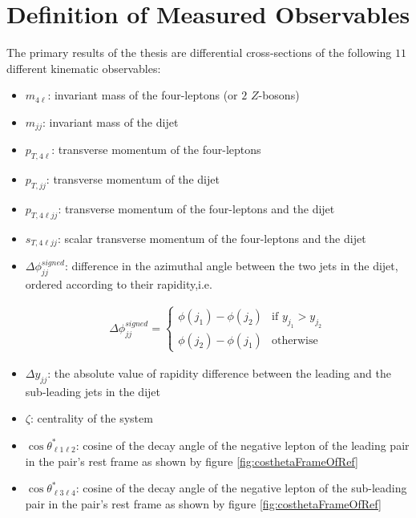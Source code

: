 \section{Definition of Measured Observables}
\label{sec:Obs}

The primary results of the thesis are differential cross-sections of the following $11$ different kinematic observables:

\begin{itemize}

\item{	$m_{4\ell}$: invariant mass of the four-leptons (or $2$ $Z$-bosons)}
\item{ 	$m_{jj}$:  invariant mass of the dijet}
\item{	$p_{T,4\ell}$: transverse momentum of the four-leptons }
\item{	$p_{T, jj}$: transverse momentum of the dijet }
\item{	$p_{T,4\ell jj}$: transverse momentum of the four-leptons and the dijet }
\item{	$s_{T,4\ell jj}$: scalar transverse momentum of the four-leptons and the dijet }
\item{ 	$\Delta \phi _{jj}^{signed}$: difference in the azimuthal angle between the two jets in the dijet, ordered according to their rapidity,i.e. 

\begin{align*}
	\Delta \phi _{jj}^{signed} = 
	\begin{cases}
	\phi(j_1)-\phi(j_2) & \text{if $y_{j_1} > y_{j_2}$}\\
	\phi(j_2)-\phi(j_1) & \text{otherwise}
	\end{cases} 
\end{align*}
}
\item{ $\Delta y_{jj}$: the absolute value of rapidity difference between the leading and the sub-leading jets in the dijet}
\item{ $\zeta$: centrality of the system}
\item{ $\cos \theta^{*}_{\ell 1 \ell 2}$: cosine of the decay angle of the negative lepton of the leading pair in the pair's rest frame as shown by figure \ref{fig:costhetaFrameOfRef}}
\item{ $\cos \theta^{*}_{\ell 3 \ell 4}$: cosine of the decay angle of the negative lepton of the sub-leading pair in the pair's rest frame as shown by figure \ref{fig:costhetaFrameOfRef} }

\end{itemize}

